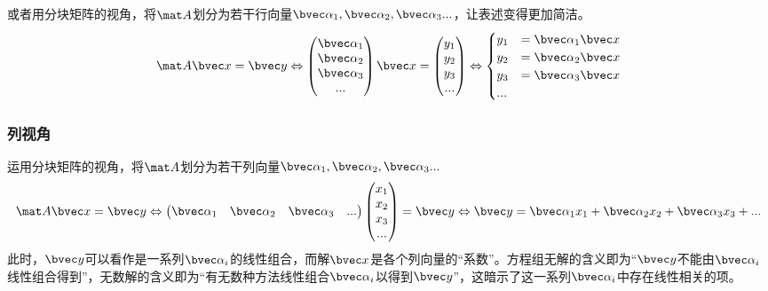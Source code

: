 或者用分块矩阵的视角，将$\mat A$划分为若干行向量$\bvec \alpha_1, \bvec \alpha_2,\bvec \alpha_3...$，让表述变得更加简洁。
$$
\mat A \bvec x=\bvec y \Leftrightarrow 
\begin{pmatrix}
\bvec \alpha_1\\
\bvec \alpha_2\\
\bvec \alpha_3\\
...
\end{pmatrix}
\bvec x
=
\begin{pmatrix}
y_{1}\\
y_{2}\\
y_{3}\\
...\\
\end{pmatrix}
\Leftrightarrow 
\begin{cases}
y_1&=\bvec \alpha_1 \bvec x\\
y_2&=\bvec \alpha_2 \bvec x\\
y_3&=\bvec \alpha_3 \bvec x\\
...&\\
\end{cases}
$$

\subsubsection{列视角}
运用分块矩阵的视角，将$\mat A$划分为若干列向量$\bvec \alpha_1, \bvec \alpha_2,\bvec \alpha_3...$
$$
\mat A \bvec x=\bvec y \Leftrightarrow 
\begin{pmatrix}
\bvec \alpha_1& \bvec \alpha_2& \bvec \alpha_3&...
\end{pmatrix}
\begin{pmatrix}
x_{1}\\
x_{2}\\
x_{3}\\
...\\
\end{pmatrix}
=
\bvec y
\Leftrightarrow 
\bvec y = \bvec \alpha_1 x_1+\bvec \alpha_2 x_2+\bvec \alpha_3 x_3+...
$$
此时，$\bvec y$可以看作是一系列$\bvec \alpha_i$的线性组合，而解$\bvec x$是各个列向量的“系数”。方程组无解的含义即为“$\bvec y$不能由$\bvec \alpha_i$线性组合得到”，无数解的含义即为“有无数种方法线性组合$\bvec \alpha_i$以得到$\bvec y$”，这暗示了这一系列$\bvec \alpha_i$中存在线性相关的项。

